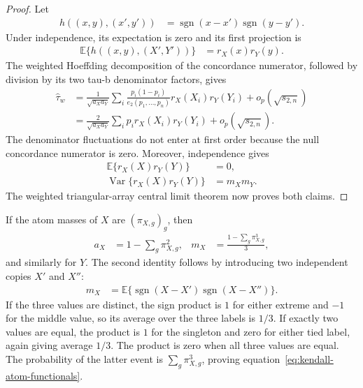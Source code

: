 \begin{proof}
Let
\begin{align*}
 h((x,y),(x',y'))
 &=\operatorname{sgn}(x-x')\operatorname{sgn}(y-y').
\end{align*}
Under independence, its expectation is zero and its first projection is
\begin{align*}
 \mathbb E\{h((x,y),(X',Y'))\}
 &=r_X(x)r_Y(y).
\end{align*}
The weighted Hoeffding decomposition of the concordance numerator, followed
by division by its two tau-b denominator factors, gives
\begin{align*}
 \widehat\tau_w
 &=\frac{1}{\sqrt{a_Xa_Y}}
 \sum_i
 \frac{p_i(1-p_i)}{e_2(p_1,\ldots,p_n)}
 r_X(X_i)r_Y(Y_i)
 +o_p(\sqrt{s_{2,n}})\\
 &=\frac{2}{\sqrt{a_Xa_Y}}
 \sum_i p_i r_X(X_i)r_Y(Y_i)
 +o_p(\sqrt{s_{2,n}}).
\end{align*}
The denominator fluctuations do not enter at first order because the null
concordance numerator is zero. Moreover, independence gives
\begin{align*}
 \mathbb E\{r_X(X)r_Y(Y)\}
 &=0,\\
 \operatorname{Var}\{r_X(X)r_Y(Y)\}
 &=m_Xm_Y.
\end{align*}
The weighted triangular-array central limit theorem now proves both claims.
\end{proof}

If the atom masses of $X$ are $(\pi_{X,g})_g$, then
\begin{align}
 a_X
 &=1-\sum_g\pi_{X,g}^2,
 &
 m_X
 &=\frac{1-\sum_g\pi_{X,g}^3}{3},
 \label{eq:kendall-atom-functionals}
\end{align}
and similarly for $Y$. The second identity follows by introducing two
independent copies $X'$ and $X''$:
\begin{align*}
 m_X
 &=\mathbb E\{
 \operatorname{sgn}(X-X')\operatorname{sgn}(X-X'')
 \}.
\end{align*}
If the three values are distinct, the sign product is $1$ for either extreme
and $-1$ for the middle value, so its average over the three labels is $1/3$.
If exactly two values are equal, the product is $1$ for the singleton and
zero for either tied label, again giving average $1/3$. The product is zero
when all three values are equal. The probability of the latter event is
$\sum_g\pi_{X,g}^3$, proving
equation~\eqref{eq:kendall-atom-functionals}.

